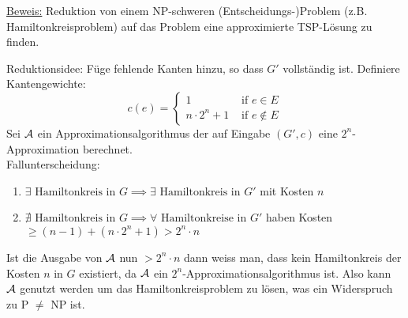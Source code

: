 \underline{Beweis:}
Reduktion von einem NP-schweren (Entscheidungs-)Problem (z.B. Hamiltonkreisproblem) auf das Problem eine
approximierte TSP-Lösung zu finden.

Reduktionsidee: Füge fehlende Kanten hinzu, so dass $G'$ vollständig ist.
Definiere Kantengewichte:
$$ c(e) = \begin{cases}
1 & \text{ if } e \in E \\
n \cdot 2^n + 1 & \text{ if } e \notin E
\end{cases} $$
Sei $\mathcal{A}$ ein Approximationsalgorithmus der auf Eingabe $(G', c)$ eine $2^n$-Approximation berechnet.
\\
Fallunterscheidung:
\begin{enumerate}
    \item $\exists \text{ Hamiltonkreis in } G \implies \exists \text{ Hamiltonkreis in } G' $ mit Kosten $n$
    \item $\nexists \text{ Hamiltonkreis in } G \implies \forall \text{ Hamiltonkreise in } G' $ haben Kosten
    $\geq (n-1) + (n \cdot 2^n + 1) > 2^n \cdot n $
\end{enumerate}
Ist die Ausgabe von $\mathcal{A}$ nun $> 2^n \cdot n$ dann weiss man, dass kein Hamiltonkreis der Kosten $n$ in $G$ existiert,
da $\mathcal{A}$ ein $2^n$-Approximationsalgorithmus ist.
Also kann $\mathcal{A}$ genutzt werden um das Hamiltonkreisproblem zu lösen, was ein Widerspruch zu P $\neq$ NP ist.

